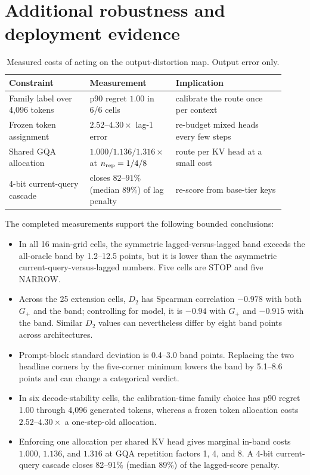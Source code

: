 \section{Additional robustness and deployment evidence}
\label{app:robustness}

\begin{table}[h]
\centering
\small
\setlength{\tabcolsep}{4pt}
\caption{Measured costs of acting on the output-distortion map. Output error only.}
\label{tab:deployment}
\begin{tabular}{@{}p{0.29\linewidth}p{0.25\linewidth}p{0.38\linewidth}@{}}
\toprule
\textbf{Constraint} & \textbf{Measurement} & \textbf{Implication} \\
\midrule
Family label over 4,096 tokens & p90 regret $1.00$ in 6/6 cells & calibrate the route once per context \\
Frozen token assignment & $2.52$--$4.30\times$ lag-1 error & re-budget mixed heads every few steps \\
Shared GQA allocation & $1.000/1.136/1.316\times$ at $n_{\rm rep}=1/4/8$ & route per KV head at a small cost \\
4-bit current-query cascade & closes $82$--$91\%$ (median $89\%$) of lag penalty & re-score from base-tier keys \\
\bottomrule
\end{tabular}
\end{table}


The completed measurements support the following bounded conclusions:
\begin{itemize}
 \item In all 16 main-grid cells, the symmetric lagged-versus-lagged band exceeds the
 all-oracle band by 1.2--12.5 points, but it is lower than the asymmetric
 current-query-versus-lagged numbers.  Five cells are STOP and five NARROW.
 \item Across the 25 extension cells, $D_2$ has Spearman correlation $-0.978$ with both
 $G_+$ and the band; controlling for model, it is $-0.94$ with $G_+$ and
 $-0.915$ with the band.  Similar $D_2$
 values can nevertheless differ by eight band points across architectures.
 \item Prompt-block standard deviation is 0.4--3.0 band points.  Replacing the
 two headline corners by the five-corner minimum lowers the band by 5.1--8.6
 points and can change a categorical verdict.
 \item In six decode-stability cells, the calibration-time family choice has p90 regret 1.00
 through 4,096 generated tokens, whereas a frozen token allocation costs
 $2.52$--$4.30\times$ a one-step-old allocation.
 \item Enforcing one allocation per shared KV head gives marginal in-band costs
 $1.000$, $1.136$, and $1.316$ at GQA repetition factors 1, 4, and 8.  A 4-bit
 current-query cascade closes 82--91\% (median 89\%) of the lagged-score penalty.
\end{itemize}

